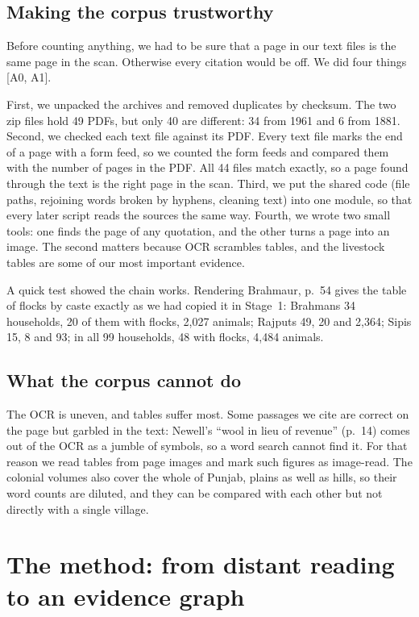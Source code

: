 \documentclass[10pt,a4paper,twocolumn]{article}
\newcommand{\entry}[1]{{\small\sffamily\color{muted}[#1]}}
\begin{document}
\subsection{Making the corpus trustworthy}

Before counting anything, we had to be sure that a page in our text files is the same page in the scan. Otherwise every citation would be off. We did four things \entry{A0, A1}.

First, we unpacked the archives and removed duplicates by checksum. The two zip files hold 49 PDFs, but only 40 are different: 34 from 1961 and 6 from 1881. Second, we checked each text file against its PDF. Every text file marks the end of a page with a form feed, so we counted the form feeds and compared them with the number of pages in the PDF. All 44 files match exactly, so a page found through the text is the right page in the scan. Third, we put the shared code (file paths, rejoining words broken by hyphens, cleaning text) into one module, so that every later script reads the sources the same way. Fourth, we wrote two small tools: one finds the page of any quotation, and the other turns a page into an image. The second matters because OCR scrambles tables, and the livestock tables are some of our most important evidence.

A quick test showed the chain works. Rendering Brahmaur, p.~54 gives the table of flocks by caste exactly as we had copied it in Stage~1: Brahmans 34 households, 20 of them with flocks, 2,027 animals; Rajputs 49, 20 and 2,364; Sipis 15, 8 and 93; in all 99 households, 48 with flocks, 4,484 animals.

\subsection{What the corpus cannot do}

The OCR is uneven, and tables suffer most. Some passages we cite are correct on the page but garbled in the text: Newell's ``wool in lieu of revenue'' (p.~14) comes out of the OCR as a jumble of symbols, so a word search cannot find it. For that reason we read tables from page images and mark such figures as image-read. The colonial volumes also cover the whole of Punjab, plains as well as hills, so their word counts are diluted, and they can be compared with each other but not directly with a single village.

\section{The method: from distant reading to an evidence graph}\label{sec:method}
\end{document}
